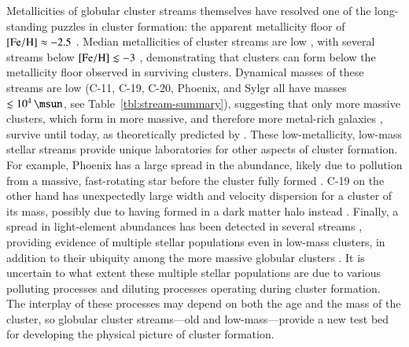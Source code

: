 \documentclass[final,5p,times,twocolumn,authoryear]{elsarticle}
\begin{document}
Metallicities of globular cluster streams themselves have resolved one of the long-standing puzzles in cluster formation: the apparent metallicity floor of ${[\mathrm{Fe}/\mathrm{H}]}\approx-2.5$ \citep[e.g.,][]{harris:1996,harris:2010,beasley:2019}.
Median metallicities of cluster streams are low \citep[$\feh\lesssim-1$,][]{martin:2022b}, with several streams below ${[\mathrm{Fe}/\mathrm{H}]}\lesssim-3$ \citep{roederer:2019,wan:2020,martin:2022a}, demonstrating that clusters can form below the metallicity floor observed in surviving clusters.
Dynamical masses of these streams are low (C-11, C-19, C-20, Phoenix, and Sylgr all have masses $\lesssim10^4\,\unit{\msun}$, see Table~\ref{tbl:stream-summary}), suggesting that only more massive clusters, which form in more massive, and therefore more metal-rich galaxies \citep[e.g.,][]{maiolino:2019}, survive until today, as theoretically predicted by \citet{kruijssen:2019}.
These low-metallicity, low-mass stellar streams provide unique laboratories for other aspects of cluster formation.
For example, Phoenix has a large spread in the  abundance, likely due to pollution from a massive, fast-rotating star before the cluster fully formed \citep{casey:2021}.
C-19 on the other hand has unexpectedly large width and velocity dispersion for a cluster of its mass, possibly due to having formed in a dark matter halo instead \citep{errani:2022}.
Finally, a spread in light-element abundances has been detected in several streams \citep{martin:2022a,balbinot:2022,usman:2024}, providing evidence of multiple stellar populations even in low-mass clusters, in addition to their ubiquity among the more massive globular clusters \citep[e.g.,][]{gratton:2012}.
It is uncertain to what extent these multiple stellar populations are due to various polluting processes \citep[e.g., massive AGB stars, fast-rotating massive stars, supermassive stars,][]{bastian:2018} and diluting processes \citep[e.g., stellar mass-loss, interactive binaries, re-accretion,][]{gratton:2019} operating during cluster formation.
The interplay of these processes may depend on both the age and the mass of the cluster, so globular cluster streams---old and low-mass---provide a new test bed for developing the physical picture of cluster formation.
\end{document}
